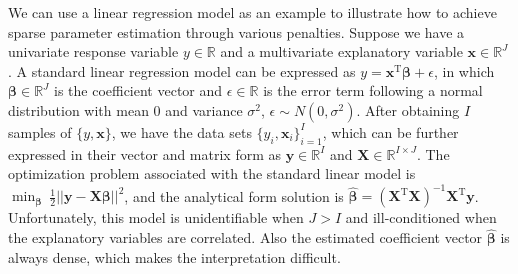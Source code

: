 We can use a linear regression model as an example to illustrate how to achieve sparse parameter estimation through various penalties. Suppose we have a univariate response variable $y\in \mathbb{R}$ and a multivariate explanatory variable $\mathbf{x} \in \mathbb{R}^{J}$. A standard linear regression model can be expressed as $y = \mathbf{x}^{\text{T}}\bm{\beta} + \epsilon$, in which $\bm{\beta} \in \mathbb{R}^{J}$ is the coefficient vector and $\epsilon \in \mathbb{R}$ is the error term following a normal distribution with mean $0$ and variance $\sigma^2$, $\epsilon \sim N(0,\sigma^2)$. After obtaining $I$ samples of $\{y, \mathbf{x}\}$, we have the data sets $\{y_i, \mathbf{x}_i\}_{i=1}^{I}$, which can be further expressed in their vector and matrix form as $\mathbf{y} \in \mathbb{R}^{I}$ and $\mathbf{X} \in \mathbb{R}^{I\times J}$. The optimization problem associated with the standard linear model is $\min_{\bm{\beta}} ~ \frac{1}{2}||\mathbf{y} - \mathbf{X}\bm{\beta}||^2$, and the analytical form solution is $\hat{\bm{\beta}} = (\mathbf{X}^{\text{T}}\mathbf{X})^{-1}\mathbf{X}^{\text{T}}\mathbf{y}$. Unfortunately, this model is unidentifiable when $J>I$ and ill-conditioned when the explanatory variables are correlated. Also the estimated coefficient vector $\hat{\bm{\beta}}$ is always dense, which makes the interpretation difficult.

